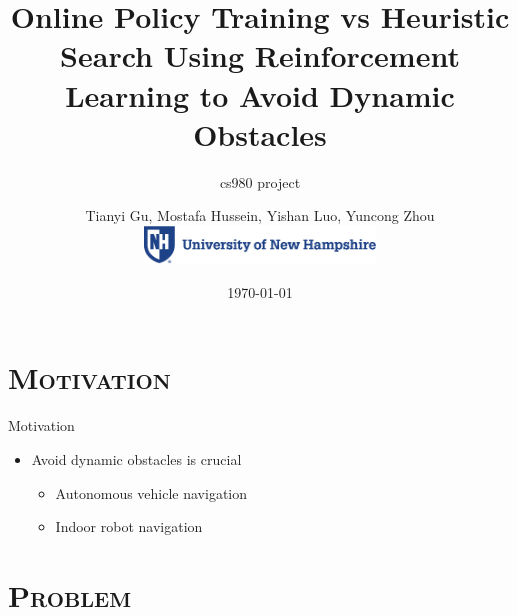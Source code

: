 \documentclass[xcolor=x11names,compress]{beamer}
\renewcommand{\(}{\begin{columns}}
\renewcommand{\)}{\end{columns}}
\newcommand{\<}[1]{\begin{column}{#1}}
\renewcommand{\>}{\end{column}}
\begin{document}
\section{\scshape Motivation}
\begin{frame}
\title{ Online Policy Training vs Heuristic Search Using
  Reinforcement Learning to Avoid Dynamic Obstacles}
\subtitle{cs980 project}
\author{
	Tianyi Gu, Mostafa Hussein, Yishan Luo, Yuncong Zhou\\
        \includegraphics[height=0.4in]{figures/unh-logo-words.eps} 
        \vspace{-0.1in}\\
}
\date{
	\today
}
\titlepage
\end{frame}

\begin{frame}{Motivation}
\begin{itemize}
\item Avoid dynamic obstacles is crucial 
\begin{itemize}
\item Autonomous vehicle navigation
\item Indoor robot navigation
\end{itemize}
\end{itemize}
\end{frame}

\section{\scshape Problem}
\end{document}
